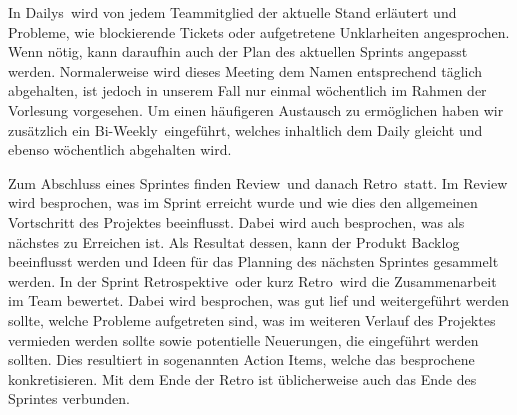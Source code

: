     In \glqq Dailys\grqq~wird von jedem Teammitglied der aktuelle Stand erläutert und Probleme, wie blockierende Tickets oder aufgetretene 
    Unklarheiten angesprochen. Wenn nötig, kann daraufhin auch der Plan des aktuellen Sprints angepasst werden. Normalerweise wird dieses Meeting 
    dem Namen entsprechend täglich abgehalten, ist jedoch in unserem Fall nur einmal wöchentlich im Rahmen der Vorlesung vorgesehen. Um einen 
    häufigeren Austausch zu ermöglichen haben wir zusätzlich ein \glqq Bi-Weekly\grqq~eingeführt, welches inhaltlich dem Daily gleicht und ebenso 
    wöchentlich abgehalten wird.

    Zum Abschluss eines Sprintes finden \glqq Review\grqq~und danach \glqq Retro\grqq~statt. Im Review wird besprochen, was im Sprint erreicht 
    wurde und wie dies den allgemeinen Vortschritt des Projektes beeinflusst. Dabei wird auch besprochen, was als nächstes zu Erreichen ist. 
    Als Resultat dessen, kann der Produkt Backlog beeinflusst werden und Ideen für das Planning des nächsten Sprintes gesammelt werden. 
    In der \glqq Sprint Retrospektive\grqq~oder kurz \glqq Retro\grqq~wird die Zusammenarbeit im Team bewertet. Dabei wird besprochen, was gut 
    lief und weitergeführt werden sollte, welche Probleme aufgetreten sind, was im weiteren Verlauf des Projektes vermieden werden sollte sowie 
    potentielle Neuerungen, die eingeführt werden sollten. Dies resultiert in sogenannten Action Items, welche das besprochene konkretisieren.
    Mit dem Ende der Retro ist üblicherweise auch das Ende des Sprintes verbunden.
